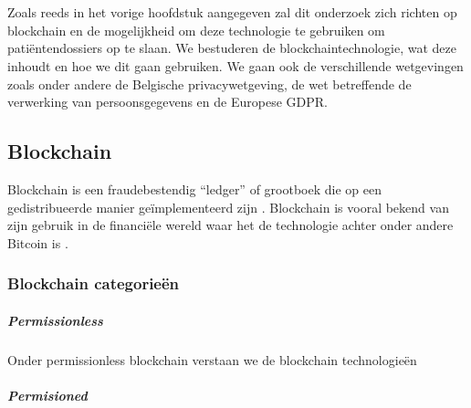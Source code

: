 \chapter{}
\label{ch:stand-van-zaken}

Zoals reeds in het vorige hoofdstuk aangegeven zal dit onderzoek zich richten op blockchain en de mogelijkheid om deze technologie te gebruiken om patiëntendossiers op te slaan. We bestuderen de blockchaintechnologie, wat deze inhoudt en hoe we dit gaan gebruiken. We gaan ook de verschillende wetgevingen zoals onder andere de Belgische privacywetgeving, de wet betreffende de verwerking van persoonsgegevens en de Europese GDPR.
\section{Blockchain}
\label{ch:blockchain}

Blockchain is een fraudebestendig ``ledger'' of grootboek die op een gedistribueerde manier geïmplementeerd zijn \autocite{Yaga2018}. Blockchain is vooral bekend van zijn gebruik in de financiële wereld waar het de technologie achter onder andere Bitcoin is \autocite{Nofer2017}. 

\subsection{Blockchain categorieën}

\paragraph{Permissionless}

Onder permissionless blockchain verstaan we de blockchain technologieën 


\paragraph{Permisioned}




